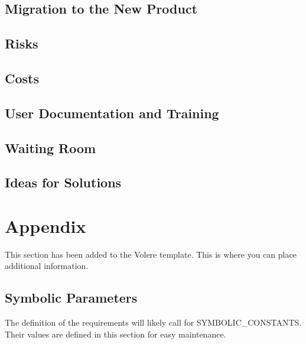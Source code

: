 \documentclass{article}
\begin{document}
\subsection{Migration to the New Product}

\subsection{Risks}

\subsection{Costs}

\subsection{User Documentation and Training}

\subsection{Waiting Room}

\subsection{Ideas for Solutions}





\newpage

\section{Appendix}

This section has been added to the Volere template.  This is where you can place
additional information.

\subsection{Symbolic Parameters}

The definition of the requirements will likely call for SYMBOLIC\_CONSTANTS.
Their values are defined in this section for easy maintenance.
\end{document}
